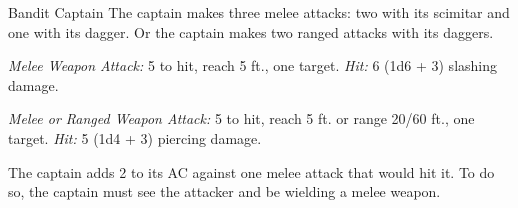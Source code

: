 \documentclass[10pt,a4paper,twoside,bg=print,twocolumn,openany,nodeprecatedcode]{dndbook}
\begin{document}
\begin{DndMonster}[float=t]{Bandit Captain}
\DndMonsterBasics[
armor-class = {15 (studded leather armor)},
hit-points = {\DndDice{10d8 + 20}},
speed = {30 ft.}
]
\DndMonsterAbilityScores[
 str = 15,
 dex = 16,
 con = 14,
 int = 14,
 wis = 11,
 cha = 14
]
\DndMonsterDetails[
saving-throws = {Str +4, Dex +5, Wis +2},
skills = {Athletics +4, Deception +4},
languages = {any two languages},
challenge = 2,
]
The captain makes three melee attacks: two with its scimitar and one with its dagger. Or the captain makes two ranged attacks with its daggers.

\textsl{Melee Weapon Attack:} 5 to hit, reach 5 ft., one target. \textsl{Hit:} 6 (1d6 + 3) slashing damage.

\textsl{Melee or Ranged Weapon Attack:} 5 to hit, reach 5 ft. or range 20/60 ft., one target. \textsl{Hit:} 5 (1d4 + 3) piercing damage.

The captain adds 2 to its AC against one melee attack that would hit it. To do so, the captain must see the attacker and be wielding a melee weapon.

\end{DndMonster}
\end{document}
